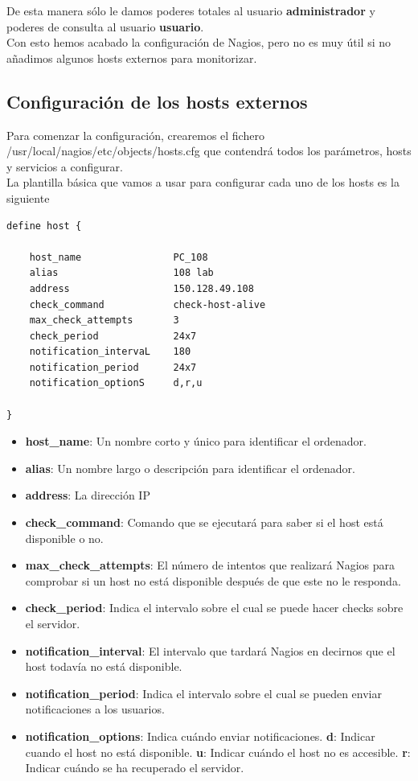 \documentclass[11pt,a4paper]{article}
\begin{document}
De esta manera sólo le damos poderes totales al usuario \textbf{administrador} y poderes de consulta al usuario \textbf{usuario}.
\\

Con esto hemos acabado la configuración de Nagios, pero no es muy útil si no añadimos algunos hosts externos para monitorizar.

\subsection{Configuración de los hosts externos}

Para comenzar la configuración, crearemos el fichero /usr/local/nagios/etc/objects/hosts.cfg que contendrá todos los parámetros, hosts y servicios a configurar.
\\

La plantilla básica que vamos a usar para configurar cada uno de los hosts es la siguiente

\begin{verbatim}
define host {

    host_name                PC_108
    alias                    108 lab
    address                  150.128.49.108
    check_command            check-host-alive
    max_check_attempts       3
    check_period             24x7
    notification_intervaL    180
    notification_period      24x7
    notification_optionS     d,r,u

}
\end{verbatim}

\begin{itemize}
\item \textbf{host\_name}: Un nombre corto y único para identificar el ordenador.
\item \textbf{alias}: Un nombre largo o descripción para identificar el ordenador.
\item \textbf{address}: La dirección IP
\item \textbf{check\_command}: Comando que se ejecutará para saber si el host está disponible o no.
\item \textbf{max\_check\_attempts}: El número de intentos que realizará Nagios para comprobar si un host no está disponible después de que este no le responda.
\item \textbf{check\_period}: Indica el intervalo sobre el cual se puede hacer checks sobre el servidor.
\item \textbf{notification\_interval}: El intervalo que tardará Nagios en decirnos que el host todavía no está disponible.
\item \textbf{notification\_period}: Indica el intervalo sobre el cual se pueden enviar notificaciones a los usuarios.
\item \textbf{notification\_options}: Indica cuándo enviar notificaciones. \textbf{d}: Indicar cuando el host no está disponible. \textbf{u}: Indicar cuándo el host no es accesible. \textbf{r}: Indicar cuándo se ha recuperado el servidor.
\end{itemize}
\end{document}
